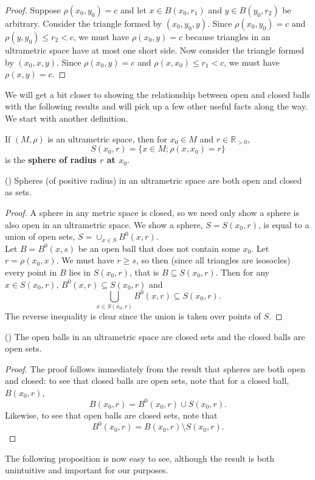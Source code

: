 \begin{proof}
Suppose $\rho(x_0, y_0)=c$ and let $x \in B(x_0, r_1)$ and $y \in B(y_0, r_2)$ be arbitrary. Consider the triangle formed by $(x_0, y_0,y)$. Since $\rho(x_0,y_0)=c$ and  $\rho(y,y_0) \leq r_2 < c$, we must have $\rho(x_0, y)=c$ because triangles in an ultrametric space have at most one short side. Now consider the triangle formed by  $(x_0, x,y)$. Since $\rho(x_0, y)=c$ and  $\rho(x,x_0) \leq r_1 < c$, we must have $\rho(x, y)=c$.
\end{proof}

We will get a bit closer to showing the relationship between open and closed balls with the following results and will pick up a few other useful facts along the way. We start with another definition.\\

\begin{definition}
	If $(M, \rho)$ is an ultrametric space, then for $x_0 \in M$ and $r \in \mathbb{R}_{> 0 }$, \[S(x_0,r) = \{x \in M; \rho(x,x_0) =r \}\] is the \textbf{sphere of radius $r$ at $x_0$}.
\end{definition}

\begin{lemma}
 (\cite{ar}) Spheres (of positive radius) in an ultrametric space are both open and closed as sets.
\end{lemma}

\begin{proof}
	\cite{ar} A sphere in any metric space is closed, so we need only show a sphere is also open in an ultrametric space. We show a sphere, $S=S(x_0,r)$, is equal to a union of open sets, $S = \cup_{x\in S} B^0(x,r)$.\\
	
	Let $B=B^0(x,s)$ be an open ball that does not contain some $x_0$. Let $r=\rho(x_0,x)$. We must have $r \geq s$, so then (since all triangles are isosocles) every point in $B$ lies in $S(x_0,r)$, that is $B \subseteq S(x_0,r)$. Then for any $x \in S(x_0,r)$, $B^0(x,r) \subseteq S(x_0,r)$ and \[\bigcup_{x \in S(x_0,r)} B^0(x,r) \subseteq S(x_0,r).\] The reverse inequality is clear since the union is taken over points of $S$.
\end{proof}

\begin{proposition}
	(\cite{ar}) The open balls in an ultrametric space are closed sets and the closed balls are open sets.
\end{proposition}

\begin{proof}
	The proof follows immediately from the result that spheres are both open and closed: to see that closed balls are open sets, note that for a closed ball, $B(x_0,r)$, \[B(x_0,r) = B^0(x_0,r) \cup S(x_0,r).\] Likewise, to see that open balls are closed sets, note that \[B^0(x_0,r) = B(x_0,r) \setminus S(x_0,r).\]
\end{proof}
The following proposition is now easy to see, although the result is both unintuitive and important for our purposes. \\

